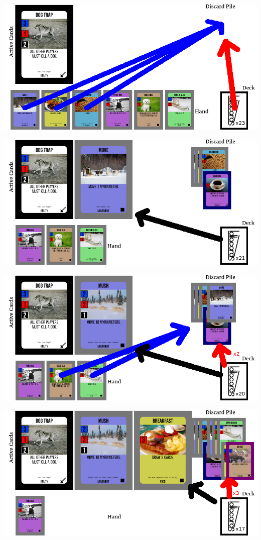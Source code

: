 \documentclass{article}
\begin{document}
\includegraphics{images/rules/example_1}\par
\includegraphics{images/rules/example_2}\par
\includegraphics{images/rules/example_3}\par
\includegraphics{images/rules/example_4}\par
\end{document}
